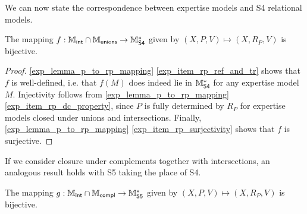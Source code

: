 We can now state the correspondence between expertise models and S4 relational
models.

\begin{theorem}
\label{exp_thm_s4_semantic_link}

    The mapping $f: \mathbb{M}_{\mathsf{int}} \cap \mathbb{M}_{\mathsf{unions}} \to \mathbb{M}^*_{\mathsf{S4}}$ given by $(X, P, V)
    \mapsto (X, R_P, V)$ is bijective.
\end{theorem}

\begin{proof}

    \cref{exp_lemma_p_to_rp_mapping} \cref{exp_item_rp_ref_and_tr} shows that $f$ is
    well-defined, i.e. that $f(M)$ does indeed lie in $\mathbb{M}^*_{\mathsf{S4}}$ for any
    expertise model $M$. Injectivity follows from \cref{exp_lemma_p_to_rp_mapping}
    \cref{exp_item_rp_dc_property}, since $P$ is fully determined by $R_P$ for
    expertise models closed under unions and intersections. Finally,
    \cref{exp_lemma_p_to_rp_mapping} \cref{exp_item_rp_surjectivity} shows that $f$
    is surjective.
\end{proof}

If we consider closure under complements together with intersections, an
analogous result holds with S5 taking the place of S4.

\begin{theorem}
\label{exp_thm_s5_semantic_link}

    The mapping $g: \mathbb{M}_{\mathsf{int}} \cap \mathbb{M}_{\mathsf{compl}} \to \mathbb{M}^*_{\mathsf{S5}}$ given by $(X, P, V)
    \mapsto (X, R_P, V)$ is bijective.
\end{theorem}

